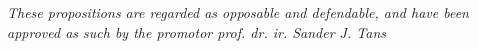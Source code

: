 



\textit{These propositions are regarded as opposable and defendable, and have
    been approved as such by the promotor prof. dr. ir. Sander J. Tans}


